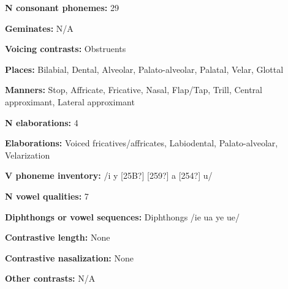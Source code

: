\begin{styleBody}
\textbf{N consonant phonemes:} 29
\end{styleBody}

\begin{styleBody}
\textbf{Geminates:} N/A
\end{styleBody}

\begin{styleBody}
\textbf{Voicing contrasts:} Obstruents
\end{styleBody}

\begin{styleBody}
\textbf{Places:} Bilabial, Dental, Alveolar, Palato-alveolar, Palatal, Velar, Glottal
\end{styleBody}

\begin{styleBody}
\textbf{Manners:} Stop, Affricate, Fricative, Nasal, Flap/Tap, Trill, Central approximant, Lateral approximant
\end{styleBody}

\begin{styleBody}
\textbf{N elaborations:} 4
\end{styleBody}

\begin{styleBody}
\textbf{Elaborations:} Voiced fricatives/affricates, Labiodental, Palato-alveolar, Velarization
\end{styleBody}

\begin{styleBody}
\textbf{V phoneme inventory:} /i y [25B?] [259?] a [254?] u/
\end{styleBody}

\begin{styleBody}
\textbf{N vowel qualities:} 7
\end{styleBody}

\begin{styleBody}
\textbf{Diphthongs or vowel sequences:} Diphthongs /ie ua ye ue/
\end{styleBody}

\begin{styleBody}
\textbf{Contrastive length:} None
\end{styleBody}

\begin{styleBody}
\textbf{Contrastive nasalization:} None
\end{styleBody}

\begin{styleBody}
\textbf{Other contrasts:} N/A
\end{styleBody}

